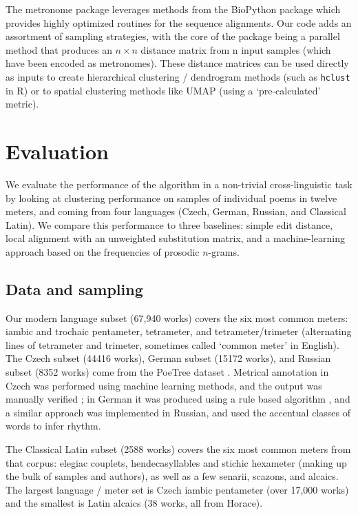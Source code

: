 \documentclass[
    hf
]{ceurart}
\begin{document}
The metronome package leverages methods from the BioPython package \cite{biopython} which provides highly optimized routines for the sequence alignments. Our code adds an assortment of sampling strategies, with the core of the package being a parallel method that produces an $n \times n$ distance matrix from n input samples (which have been encoded as metronomes). These distance matrices can be used directly as inputs to create hierarchical clustering / dendrogram methods (such as \texttt{hclust} in R) or to spatial clustering methods like UMAP (using a `pre-calculated' metric).

\section{Evaluation}

We evaluate the performance of the algorithm in a non-trivial cross-linguistic task by looking at clustering performance on samples of individual poems in twelve meters, and coming from four languages (Czech, German, Russian, and Classical Latin). We compare this performance to three baselines: simple edit distance, local alignment with an unweighted substitution matrix, and a machine-learning approach based on the frequencies of prosodic $n$-grams.

\subsection{Data and sampling}

Our modern language subset (67,940 works) covers the six most common meters: iambic and trochaic pentameter, tetrameter, and tetrameter/trimeter (alternating lines of tetrameter and trimeter, sometimes called `common meter' in English). The Czech subset (44416 works), German subset (15172 works), and Russian subset (8352 works) come from the PoeTree dataset  \cite{plechac_poetree_2023}. Metrical annotation in Czech was performed using machine learning methods, and the output was manually verified  \cite{plechac_czech_2016}; in German it was produced using a rule based algorithm \cite{bobenhausen_metrique_2015}, and a similar approach was implemented in Russian, and used the accentual classes of words to infer rhythm.

The Classical Latin subset (2588 works) covers the six most common meters from that corpus: elegiac couplets, hendecasyllables and stichic hexameter (making up the bulk of samples and authors), as well as a few senarii, scazons, and alcaics. The largest language / meter set is Czech iambic pentameter (over 17,000 works) and the smallest is Latin alcaics (38 works, all from Horace).
\end{document}
